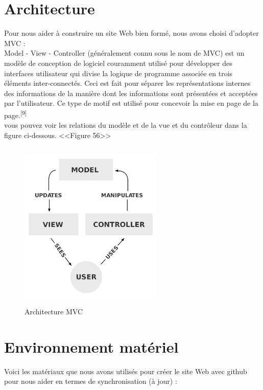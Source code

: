 \documentclass[12pt]{report}
\begin{document}
\section{Architecture}

Pour nous aider à construire un site Web bien formé, nous avons choisi d'adopter MVC :
\\
Model - View - Controller (généralement connu sous le nom de MVC) est un modèle de conception de logiciel couramment utilisé pour développer des interfaces utilisateur qui divise la logique de programme associée en trois éléments inter-connectés. Ceci est fait pour séparer les représentations internes des informations de la manière dont les informations sont présentées et acceptées par l'utilisateur. Ce type de motif est utilisé pour concevoir la mise en page de la page.\textsuperscript{[9]}
\\
vous pouvez voir les relations du modèle et de la vue et du contrôleur dans la figure ci-dessous. <<Figure 56>>

\newpage

\begin{figure}[h]
\centering
    \includegraphics[width = 2.7in, height = 3.2in]{../Images/MVC.png}
\caption{Architecture MVC}
\end{figure}

\section{Environnement matériel}

Voici les matériaux que nous avons utilisés pour créer le site Web avec github pour nous aider en termes de synchronisation (à jour) :

\vspace{0.4in}
\end{document}
